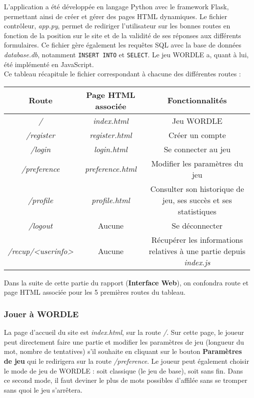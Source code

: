 \tabto{1cm}L'application a été développée en langage Python avec le framework Flask, permettant ainsi de créer et gérer des pages HTML dynamiques. Le fichier contrôleur, \emph{app.py}, permet de rediriger l'utilisateur sur les bonnes routes en fonction de la position sur le site et de la validité de ses réponses aux différents formulaires. Ce fichier gère également les requêtes SQL avec la base de données \emph{database.db}, notamment \texttt{INSERT INTO} et \texttt{SELECT}. Le jeu WORDLE a, quant à lui, été implémenté en JavaScript.\\

Ce tableau récapitule le fichier correspondant à chacune des différentes routes :

\begin{center}
\begin{tabular}{|c|c|c|}
    \hline
    \textbf{Route} & \textbf{Page HTML associée} & \textbf{Fonctionnalités} \\
    \hline
    \emph{/} & \emph{index.html} & Jeu WORDLE \\
    \hline
    \emph{/register} & \emph{register.html} & Créer un compte \\
    \hline
    \emph{/login} & \emph{login.html} & Se connecter au jeu \\
    \hline
    \emph{/preference} & \emph{preference.html} & Modifier les paramètres du jeu \\
    \hline
    \emph{/profile} & \emph{profile.html} & Consulter son historique de jeu, ses succès et ses statistiques \\
    \hline
    \emph{/logout} & Aucune & Se déconnecter \\
    \hline
    \emph{/recup/<userinfo>} & Aucune & Récupérer les informations relatives à une partie depuis \emph{index.js} \\
    \hline
\end{tabular}
\end{center}

\vspace{0.5cm}

\tabto{1cm}Dans la suite de cette partie du rapport (\textbf{Interface Web}), on confondra route et page HTML associée pour les 5 premières routes du tableau.

\subsubsection*{Jouer à WORDLE}

\tabto{1cm}La page d'accueil du site est \emph{index.html}, sur la route \emph{/}. Sur cette page, le joueur peut directement faire une partie et modifier les paramètres de jeu (longueur du mot, nombre de tentatives) s'il souhaite en cliquant sur le bouton \textbf{Paramètres de jeu} qui le redirigera sur la route \emph{/preference}. Le joueur peut également choisir le mode de jeu de WORDLE : soit classique (le jeu de base), soit sans fin. Dans ce second mode, il faut deviner le plus de mots possibles d'affilée sans se tromper sans quoi le jeu s'arrêtera. \\

